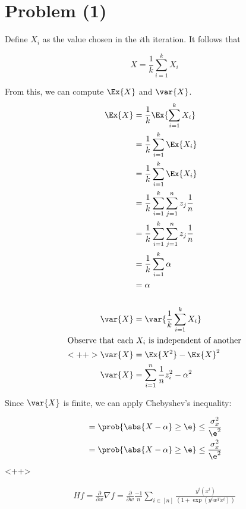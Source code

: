 \documentclass[../main.tex]{subfiles}
\begin{document}

\section*{Problem (1)}


Define $X_{i}$ as the value chosen in the $i$th iteration. It follows that

\[
    X = \frac{1}{k}\sum_{i=1}^{k} X_{i}
\]

From this, we can compute $\Ex{X}$ and $\var{X}$.
\begin{align*}
    \Ex{X} &= \frac{1}{k} \Ex{\sum_{i=1}^{k} X_{i}} \\
    &= \frac{1}{k} \sum_{i=1}^{k} \Ex{X_{i}} \\
    &= \frac{1}{k} \sum_{i=1}^{k} \Ex{X_{i}} \\
    &= \frac{1}{k} \sum_{i=1}^{k} \sum_{j=1}^{n}z_{j} \frac{1}{n} \\
    &= \frac{1}{k} \sum_{i=1}^{k} \sum_{j=1}^{n}z_{j} \frac{1}{n} \\
    &= \frac{1}{k} \sum_{i=1}^{k} \alpha \\
    &= \alpha \\
    \\
    \var{X} &= \var{\frac{1}{k}\sum_{i=1}^{k} X_{i}} \\
    \intertext{Observe that each $X_{i}$ is independent of another}<++>
    \var{X} &= \Ex{X^2} - \Ex{X}^2 \\
    \var{X} &= \sum_{i=1}^{n}\frac{1}{n}z_{i}^2 - \alpha^2 \\
\end{align*}

Since $\var{X}$ is finite, we can apply Chebyshev's inequality:

\begin{align*}
    &= \prob{\abs{X - \alpha} \geq \e} \leq \frac{\sigma_{x}^2}{\e^2} \\
    &= \prob{\abs{X - \alpha} \geq \e} \leq \frac{\sigma_{x}^2}{\e^2} \\
\end{align*}<++>


\begingroup
\addtolength{\jot}{1em}
\begin{align*}
    H f = \frac{\partial }{\partial w}\nabla f = \frac{\partial }{\partial w} \frac{-1}{n}\sum_{i \in [n]}^{}\frac{y^{i}(x^{i})}{\left(1 + \exp(y^{i}w^Tx^{i})\right)}   \\ 
\end{align*}
\endgroup




%
%
\end{document}
